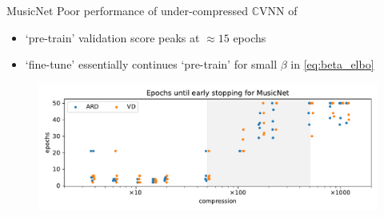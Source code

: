 \documentclass{beamer}
\newcommand{\cplx}{\mathbb{C}}
\begin{document}

\appendix
\begin{frame}[c]{MusicNet}{\insertsection}
  Poor performance of under-compressed $\cplx$VNN of \citet{trabelsi_deep_2018}
  \begin{itemize}
    \item `pre-train' validation score peaks at $\approx 15$ epochs
    \item `fine-tune' essentially continues `pre-train' for small $\beta$ in \eqref{eq:beta_elbo}
  \end{itemize}

  \begin{figure}[t]
    \centering
    \includegraphics[width=\linewidth]{figure__fine-tune_fx__early__compression.pdf}
  \end{figure}
\end{frame}
\end{document}
